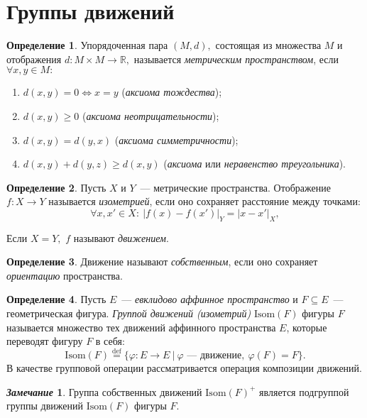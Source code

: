 \documentclass[a4paper, 14pt]{extarticle}
\newcommand{\deq}{\stackrel{\mathrm{def}}{=}}
\newcommand{\n}{\par}
\newcommand{\real}{\mathbb{R}}
\newcommand{\suchthat}{{:}{ } \ }
\newcommand{\Isom}{\mathrm{Isom}}
\renewcommand{\phi}{\varphi}
\theoremstyle{definition}
\newtheorem*{remark}{\textit{Замечание}}
\newtheorem{definition}{Определение}
\theoremstyle{plain}
\numberwithin{theorem}{section}
\numberwithin{definition}{section}
\numberwithin{statement}{section}
\numberwithin{lemma}{section}
\numberwithin{consequence}{section}
\begin{document}
	\section{Группы движений}
	\setcounter{definition}{0}
	\begin{definition}
		Упорядоченная пара ${(M, d),}$ состоящая из множества $M$ и отображения ${d : M \times M \rightarrow \real,}$  называется \textit{метрическим пространством}, если ${\forall x, y \in M{:}}$
		\begin{enumerate}
			\setlength\itemsep{0.1em}
			\item ${d(x, y) = 0 \Leftrightarrow x = y}$ (\textit{аксиома тождества});
			\item ${d(x, y) \geqslant 0}$ (\textit{аксиома неотрицательности});
			\item ${d(x, y) = d(y, x)}$ (\textit{аксиома симметричности});
			\item ${d(x, y) + d(y, z) \geqslant d(x, y)}$ (\textit{аксиома} или \textit{неравенство треугольника}).
		\end{enumerate}
	\end{definition}
	\begin{definition}
		Пусть $X$ и $Y$~--- метрические пространства. Отображение ${f : X \rightarrow Y}$ называется \textit{изометрией}, если оно сохраняет расстояние между точками:
		\begin{equation*}
			\forall x, x' \in X\suchthat |f(x) - f(x')|_Y = |x - x'|_X,
		\end{equation*} \n
		Если ${X = Y,}$ $f$ называют \textit{движением}.
	\end{definition}
	\begin{definition}
		Движение называют \textit{собственным}, если оно сохраняет \textit{ориентацию} пространства.
	\end{definition}
	\begin{definition}
		Пусть $E$~--- \textit{евклидово аффинное пространство} и ${F \subseteq E}$~--- геометрическая фигура. \textit{Группой движений (изометрий)} ${\Isom(F)}$ фигуры $F$ называется множество тех движений аффинного пространства $E$, которые  переводят фигуру $F$ в себя:
		\begin{equation*}
			\Isom(F) \deq \{\phi: E \rightarrow E \ | \ \phi\textrm{~--- движение}, \ \phi(F) = F\}.
		\end{equation*} 
		В качестве групповой операции рассматривается операция композиции движений.
	\end{definition}
	\begin{remark}
		Группа собственных движений ${\Isom(F)^+}$ является подгруппой группы движений ${\Isom(F)}$ фигуры $F.$
	\end{remark}
\end{document}
